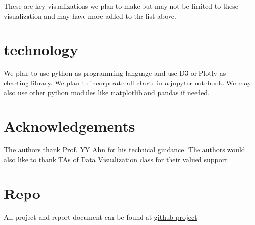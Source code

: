 \documentclass[sigconf]{acmart}
\begin{document}
These are key visualizations we plan to make but may not be limited to these 
visualization and may have more added to the list above. 

\section{technology}
We plan to use python as programming language and use D3 or Plotly as charting
library. We plan to incorporate all charts in a jupyter notebook. We may also
use other python modules like matplotlib and pandas if needed. 




%

%



\section{Acknowledgements}
 The authors thank Prof. YY Ahn for his technical guidance. The
 authors would also like to thank TAs of Data Visualization class for their valued
 support. 

\section{Repo} 
 All project and report document can be found at \href{https://github.com/abhishek8gupta/dviz-project-summer2018/blob/master/report/main.pdf}{github project}.

\nocite{*}


\end{document}
